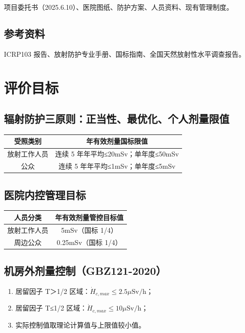 项目委托书（2025.6.10）、医院图纸、防护方案、人员资料、现有管理制度。

\subsection{参考资料}

ICRP103 报告、放射防护专业手册、国标指南、全国天然放射性水平调查报告。

\section{评价目标}

\subsection{辐射防护三原则：正当性、最优化、个人剂量限值}

\begin{table}[H]
\centering
\begin{tabular}{|c|c|}
\hline
受照类别 & 年有效剂量国标限值 \\
\hline
放射工作人员 & 连续 5 年年平均≤20mSv；单年度≤50mSv \\
\hline
公众 & 连续 5 年年平均≤1mSv；单年度≤5mSv \\
\hline
\end{tabular}
\end{table}


\subsection{医院内控管理目标}

\begin{table}[H]
\centering
\begin{tabular}{|c|c|}
\hline
人员分类 & 年有效剂量管控目标值 \\
\hline
放射工作人员 & 5mSv（国标 1/4） \\
\hline
周边公众 & 0.25mSv（国标 1/4） \\
\hline
\end{tabular}
\end{table}


\subsection{机房外剂量控制（GBZ121-2020）}

\begin{enumerate}
\item 居留因子 T＞1/2 区域：$\dot{H}_{c,max}\le2.5\mu\text{Sv/h}$；
\item 居留因子 T≤1/2 区域：$\dot{H}_{c,max}\le10\mu\text{Sv/h}$；
\item 实际控制值取理论计算值与上限值较小值。
\end{enumerate}

